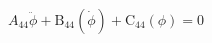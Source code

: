 \begin{equation}
A_{44} \ddot{\phi} + \operatorname{B_{44}}\left(\dot{\phi}\right) + \operatorname{C_{44}}\left(\phi\right) = 0
\end{equation}
